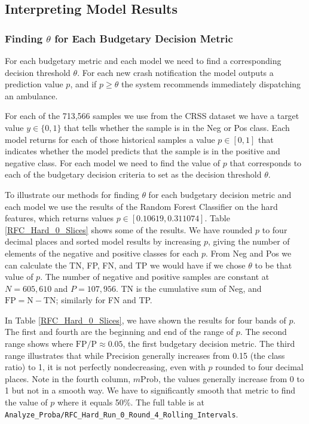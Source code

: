 \subsection{Interpreting Model Results}
\label{interpreting}

\subsubsection{Finding $\theta$ for Each Budgetary Decision Metric}
\label{finding_theta}

For each budgetary metric and each model we need to find a corresponding decision threshold $\theta$.  For each new crash notification the model outputs a prediction value $p$, and if $p \ge \theta$ the system recommends immediately dispatching an ambulance.  

For each of the 713,566 samples we use from the CRSS dataset we have a target value $y \in \{0,1\}$ that tells whether the sample is in the Neg or Pos class.  Each model returns for each of those historical samples a value $p \in [0,1]$ that indicates whether the model predicts that the sample is in the positive and negative class.  For each model we need to find the value of $p$ that corresponds to each of the budgetary decision criteria to set as the decision threshold $\theta$.  

To illustrate our methods for finding $\theta$ for each budgetary decision metric and each model we use the results of the Random Forest Classifier on the hard features, which returns values  $p \in [0.10619,0.311074]$.  Table \ref{RFC_Hard_0_Slices}  shows some of the results.  We have rounded $p$ to four decimal places and sorted model results by increasing $p$, giving the number of elements of the negative and positive classes for each $p$.  From Neg and Pos we can calculate the TN, FP, FN, and TP we would have if we chose $\theta$ to be that value of $p$.  The number of negative and positive samples are constant at $N=605,610$ and $P=107,956$. TN is the cumulative sum of Neg, and $\text{FP} = \text{N} - \text{TN}$; similarly for FN and TP.  

In Table \ref{RFC_Hard_0_Slices}, we have shown the results for four bands of $p$.  The first and fourth are the beginning and end of the range of $p$.  The second range shows where $\text{FP/P} \approx 0.05$, the first budgetary decision metric.  The third range illustrates that while Precision generally increases from 0.15 (the class ratio) to 1, it is not perfectly nondecreasing, even with $p$ rounded to four decimal places.  Note in the fourth column, $m$Prob, the values generally increase from 0 to 1 but not in a smooth way.  We have to significantly smooth that metric to find the value of $p$ where it equals 50\%.  The full table is at 
\verb|Analyze_Proba/RFC_Hard_Run_0_Round_4_Rolling_Intervals|.

